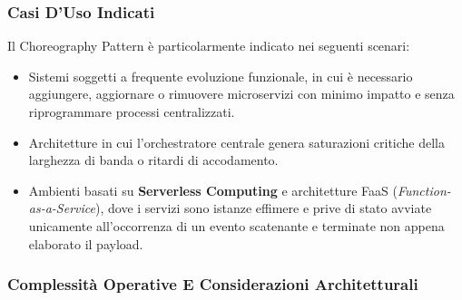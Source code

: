 \documentclass[11pt, a4paper]{article}
\begin{document}
\subsubsection{Casi D'Uso Indicati}

Il Choreography Pattern è particolarmente indicato nei seguenti scenari:
\begin{itemize}[noitemsep]
    \item Sistemi soggetti a frequente evoluzione funzionale, in cui è necessario aggiungere, aggiornare o rimuovere microservizi con minimo impatto e senza riprogrammare processi centralizzati.
    \item Architetture in cui l'orchestratore centrale genera saturazioni critiche della larghezza di banda o ritardi di accodamento.
    \item Ambienti basati su \textbf{Serverless Computing} e architetture FaaS (\emph{Function-as-a-Service}), dove i servizi sono istanze effimere e prive di stato avviate unicamente all'occorrenza di un evento scatenante e terminate non appena elaborato il payload.
\end{itemize}

\subsubsection{Complessità Operative E Considerazioni Architetturali}
\end{document}
